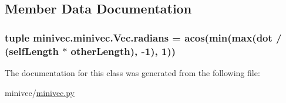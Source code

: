 \subsection{Member Data Documentation}
\hypertarget{classminivec_1_1minivec_1_1_vec_ac08a2b6165dcf25f73dc8c87fd981a1f}{}
\subsubsection[{radians}]{\setlength{\rightskip}{0pt plus 5cm}tuple minivec.\+minivec.\+Vec.\+radians = acos(min(max({\bf dot} / (self\+Length $\ast$ other\+Length), -\/1), 1))\hspace{0.3cm}{\ttfamily [static]}}\label{classminivec_1_1minivec_1_1_vec_ac08a2b6165dcf25f73dc8c87fd981a1f}


The documentation for this class was generated from the following file\+:\begin{DoxyCompactItemize}
\item 
minivec/\hyperlink{minivec_8py}{minivec.\+py}\end{DoxyCompactItemize}
